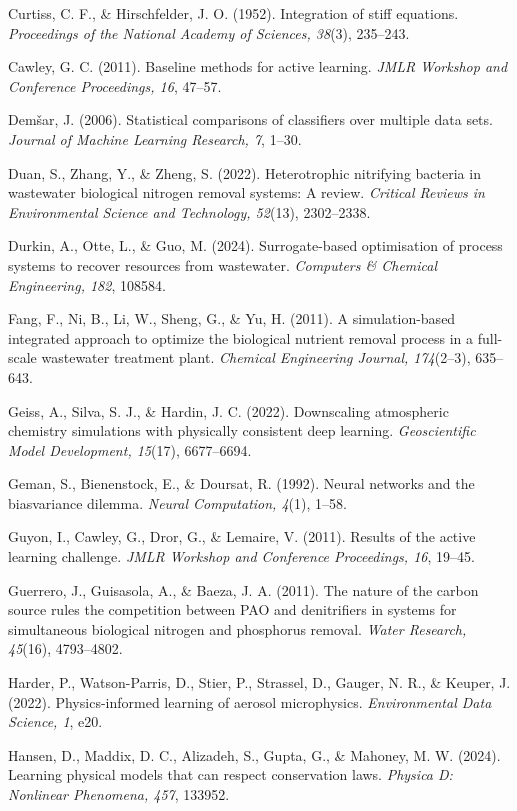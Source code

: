 \documentclass[a4paper,fleqn]{cas-sc}
\begin{document}
\noindent Curtiss, C. F., \& Hirschfelder, J. O. (1952). Integration of stiff equations. \textit{Proceedings of the National Academy of Sciences, 38}(3), 235--243.

\noindent Cawley, G. C. (2011). Baseline methods for active learning. \textit{JMLR Workshop and Conference Proceedings, 16}, 47--57.

\noindent Dem\v{s}ar, J. (2006). Statistical comparisons of classifiers over multiple data sets. \textit{Journal of Machine Learning Research, 7}, 1--30.

\noindent Duan, S., Zhang, Y., \& Zheng, S. (2022). Heterotrophic nitrifying bacteria in wastewater biological nitrogen removal systems: A review. \textit{Critical Reviews in Environmental Science and Technology, 52}(13), 2302--2338.

\noindent Durkin, A., Otte, L., \& Guo, M. (2024). Surrogate-based optimisation of process systems to recover resources from wastewater. \textit{Computers \& Chemical Engineering, 182}, 108584.

\noindent Fang, F., Ni, B., Li, W., Sheng, G., \& Yu, H. (2011). A simulation-based integrated approach to optimize the biological nutrient removal process in a full-scale wastewater treatment plant. \textit{Chemical Engineering Journal, 174}(2--3), 635--643.

\noindent Geiss, A., Silva, S. J., \& Hardin, J. C. (2022). Downscaling atmospheric chemistry simulations with physically consistent deep learning. \textit{Geoscientific Model Development, 15}(17), 6677--6694.

\noindent Geman, S., Bienenstock, E., \& Doursat, R. (1992). Neural networks and the bias\/variance dilemma. \textit{Neural Computation, 4}(1), 1--58.

\noindent Guyon, I., Cawley, G., Dror, G., \& Lemaire, V. (2011). Results of the active learning challenge. \textit{JMLR Workshop and Conference Proceedings, 16}, 19--45.

\noindent Guerrero, J., Guisasola, A., \& Baeza, J. A. (2011). The nature of the carbon source rules the competition between PAO and denitrifiers in systems for simultaneous biological nitrogen and phosphorus removal. \textit{Water Research, 45}(16), 4793--4802.

\noindent Harder, P., Watson-Parris, D., Stier, P., Strassel, D., Gauger, N. R., \& Keuper, J. (2022). Physics-informed learning of aerosol microphysics. \textit{Environmental Data Science, 1}, e20.

\noindent Hansen, D., Maddix, D. C., Alizadeh, S., Gupta, G., \& Mahoney, M. W. (2024). Learning physical models that can respect conservation laws. \textit{Physica D: Nonlinear Phenomena, 457}, 133952.
\end{document}
